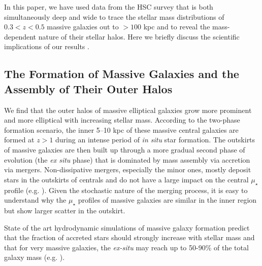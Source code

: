 \documentclass[a4paper,fleqn,usenatbib]{mnras}
\def\mden{{$\mu_{\star}$}}
\begin{document}
    In this paper, we have used  data from the HSC survey that is both simultaneously deep and wide to trace the stellar mass distributions of 
    $0.3 < z < 0.5$ massive galaxies out to $>100$ kpc and to reveal the mass-dependent nature 
    of their stellar halos.
    Here we briefly discuss the scientific implications of our results .
    

\subsection{The Formation of Massive Galaxies and the Assembly of Their Outer Halos}
    \label{ssec:twophase}
            
    We find that the outer halos of massive elliptical galaxies grow more prominent and 
    more elliptical with increasing stellar mass.
    According to the two-phase formation scenario, the inner 5--10 kpc of these 
    massive central galaxies are formed at $z>1$ during an intense period of 
    \textit{in situ} star formation. 
    The outskirts of massive galaxies are then built up through a more gradual second 
    phase of evolution (the \textit{ex situ} phase) that is dominated by mass assembly via 
    accretion via mergers.
    Non-dissipative mergers, especially the minor ones, mostly deposit stars in the 
    outskirts of centrals and do not have a large impact on the central \mden{} 
    profile (e.g. \citealt{BoylanKolchin2008, Oogi2013, Bedorf2013}).
    Given the stochastic nature of the merging process, it is easy to understand why 
    the \mden{} profiles of massive galaxies are similar in the inner region but show
    larger scatter in the outskirt. 
        
    State of the art hydrodynamic simulations of massive galaxy formation predict 
    that the fraction of accreted stars should strongly increase with stellar 
    mass and that for very massive galaxies, the \textit{ex-situ} may reach up to 
    50-90\% of the total galaxy mass (e.g.
    \citealt{Oser2010, Cooper2013, Dubois2013, LeeYi2013, Hirschmann2015,
    RodriguezGomez2016}). 
    
\end{document}
